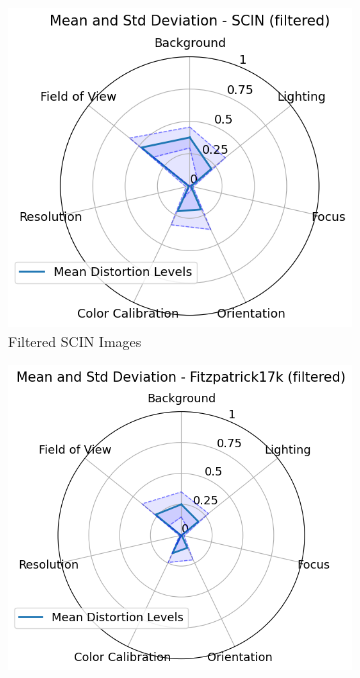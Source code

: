 \begin{figure}[ht]
    \centering
    \begin{subfigure}[b]{0.32\textwidth}
        \includegraphics[width=\textwidth]{img/SCIN_hept.png}
        \caption{Filtered SCIN Images}
        \label{fig:scin_hept}
    \end{subfigure}
    \hfill
    \begin{subfigure}[b]{0.32\textwidth}
        \includegraphics[width=\textwidth]{img/F17K_hept.png}

\end{subfigure}
\end{figure}
